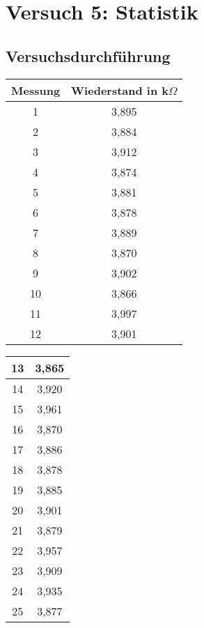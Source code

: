 \chapter{Versuch 5: Statistik}

\section{Versuchsdurchführung}

\begin{tabular}[h]{c|c}
	Messung & Wiederstand in k$\Omega$ \\
	\hline
	1 & 3,895\\
	\hline
	2& 3,884\\
	\hline
	3 & 3,912\\
	\hline
	4 & 3,874\\
	\hline
	5& 3,881\\
	\hline
	6 & 3,878\\
	\hline
	7 & 3,889\\
	\hline
	8& 3,870\\
	\hline
	9 & 3,902\\
	\hline
	10 & 3,866\\
	\hline
	11& 3,997\\
	\hline
	12& 3,901
    \label{tab:Messreihe Wiederstände 1}
\end{tabular}
\begin{tabular}[h]{c|c}  
	13& 3,865\\
	\hline
	14& 3,920\\
	\hline
	15& 3,961\\
	\hline
	16& 3,870\\
	\hline
	17& 3,886\\
	\hline
	18& 3,878\\
	\hline
	19& 3,885\\
	\hline
	20& 3,901\\
	\hline
	21& 3,879\\
	\hline
	22& 3,957\\
	\hline
	23& 3,909\\
	\hline
	24& 3,935\\
	\hline
	25& 3,877
	\label{tab:Messreihe Wiederstände 2}
\end{tabular}
